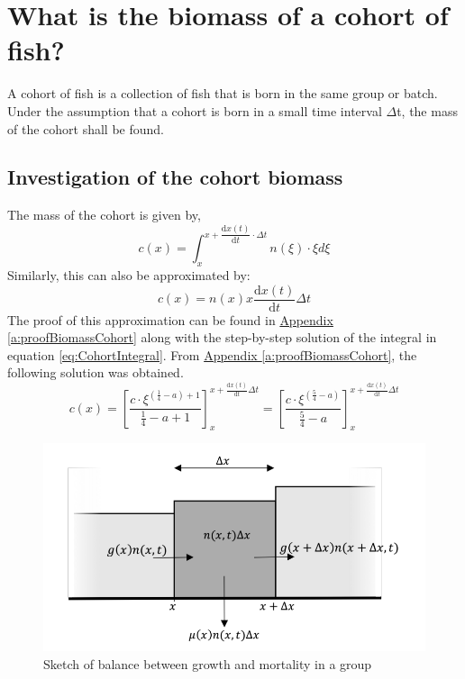 \documentclass{article}
\numberwithin{equation}{section} %
\newcommand{\md}{\mathrm{d}}
\begin{document}
\section{What is the biomass of a cohort of fish?}\label{sec:Ex2}
A cohort of fish is a collection of fish that is born in the same group or batch. Under the assumption that a cohort is born in a small time interval $\Delta$t, the mass of the cohort shall be found.

\subsection{Investigation of the cohort biomass}\label{sec:Ex2A}
The mass of the cohort is given by,
\begin{equation}\label{eq:CohortIntegral}
  c(x) = \int_{x}^{x+\dfrac{\md x(t)}{\md t}\cdot\Delta t} n(\xi)\cdot\xi d\xi
\end{equation}
Similarly, this can also be approximated by:
\begin{equation}\label{eq:apprCohortBiomass}
	c(x)=n(x)x\dfrac{\md x(t)}{\md t}\Delta t
\end{equation}
The proof of this approximation can be found in \hyperref[a:proofBiomassCohort]{Appendix \ref{a:proofBiomassCohort}} along with the step-by-step solution of the integral in equation \ref{eq:CohortIntegral}. From \hyperref[a:proofBiomassCohort]{Appendix \ref{a:proofBiomassCohort}}\label{jmp:a:proofBiomassCohort}, the following solution was obtained.
\begin{equation}\label{eq:e2integralsolution}
    c(x) = \left[\dfrac{c\cdot\xi^{(\tfrac{1}{4}-a)+1}}{\tfrac{1}{4}-a+1}\right]_x^{x+\tfrac{\md x(t)}{\md t}\Delta t} = \left[\dfrac{c\cdot\xi^{(\tfrac{5}{4}-a)}}{\tfrac{5}{4}-a}\right]_x^{x+\tfrac{\md x(t)}{\md t}\Delta t}
\end{equation}
\begin{figure}
    \includegraphics[width=0.9\linewidth]{exercises/ex2_balance}
    \caption{Sketch of balance between growth and mortality in a group}
    \label{fig:Balance}
\end{figure}
\end{document}
